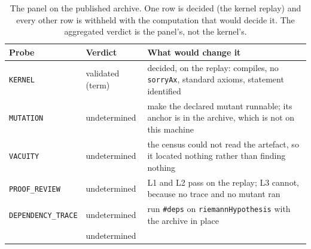 \documentclass[11pt,a4paper]{article}
\newcommand{\verdict}[1]{\textsf{#1}}
\begin{document}
\begin{table}[htbp]
\centering
\caption{The panel on the published archive. One row is decided (the kernel replay) and every
other row is withheld with the computation that would decide it. The aggregated verdict is the
panel's, not the kernel's.}
\label{tab:executed}
\footnotesize
\begin{tabularx}{\textwidth}{@{}>{\raggedright\arraybackslash}p{2.6cm}>{\raggedright\arraybackslash}p{2.4cm}>{\raggedright\arraybackslash}X@{}}
\toprule
Probe & Verdict & What would change it \\
\midrule
\texttt{KERNEL} & \verdict{validated (term)} & decided, on the replay: compiles, no
  \texttt{sorryAx}, standard axioms, statement identified \\
\texttt{MUTATION} & \verdict{undetermined} & make the declared mutant runnable; its anchor is in
  the archive, which is not on this machine \\
\texttt{VACUITY} & \verdict{undetermined} & the census could not read the artefact, so it located
  nothing rather than finding nothing \\
\texttt{PROOF\_REVIEW} & \verdict{undetermined} & L1 and L2 pass on the replay; L3 cannot, because
  no trace and no mutant ran \\
\texttt{DEPENDENCY\_TRACE} & \verdict{undetermined} & run \texttt{\#deps} on
  \texttt{riemannHypothesis} with the archive in place \\
\midrule
\multicolumn{2}{@{}l}{Aggregated} & \verdict{undetermined} \\
\bottomrule
\end{tabularx}
\end{table}
\end{document}
